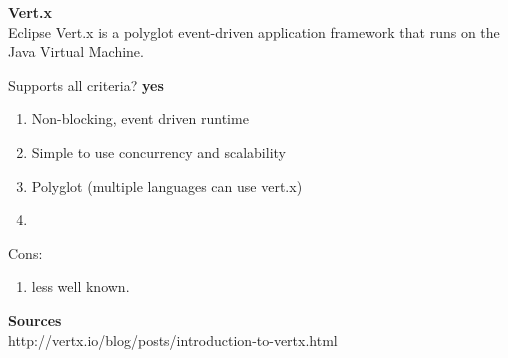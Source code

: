 
\textbf{Vert.x} \\
Eclipse Vert.x is a polyglot event-driven application framework that runs on the Java Virtual Machine.

Supports all criteria?
\textbf{yes}

\begin{enumerate}
	\item Non-blocking, event driven runtime
	\item Simple to use concurrency and scalability
	\item Polyglot (multiple languages can use vert.x)
	\item 
\end{enumerate}
Cons:
\begin{enumerate}
	\item less well known.
\end{enumerate}

\textbf{Sources}\\
http://vertx.io/blog/posts/introduction-to-vertx.html